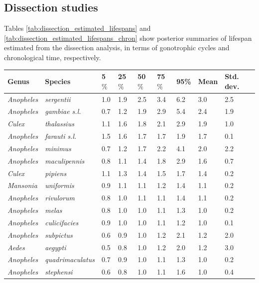 \documentclass[12pt]{article}
\begin{document}
{\subsection{Dissection studies}
Tables \ref{tab:dissection_estimated_lifespans} and \ref{tab:dissection_estimated_lifespans_chron} show posterior summaries of lifespan estimated from the dissection analysis, in terms of gonotrophic cycles and chronological time, respectively.

\begin{table}[htbp]
\begin{tabular}{l|l|l|l|l|l|l|l|l}
	\textbf{Genus} & \textbf{Species} & \textbf{5$\%$} & \textbf{25$\%$} & \textbf{50$\%$} & \textbf{75$\%$} & \textbf{95\%} &  \textbf{Mean} & \textbf{Std. dev.}\\
		\hline
		\textit{Anopheles} & \textit{sergentii} & 1.0 & 1.9 & 2.5 & 3.4 & 6.2 & 3.0 & 2.5 \\
		\textit{Anopheles} & \textit{gambiae s.l.} & 0.7 & 1.2 & 1.9 & 2.9 & 5.4 & 2.4 & 1.9 \\
		\textit{Culex} & \textit{thalassius} & 1.1 & 1.6 & 1.8 & 2.1 & 2.9 & 1.9 & 1.0 \\
		\textit{Anopheles} & \textit{farauti s.l.} & 1.5 & 1.6 & 1.7 & 1.7 & 1.9 & 1.7 & 0.1 \\
		\textit{Anopheles} & \textit{minimus} & 0.7 & 1.2 & 1.7 & 2.2 & 4.1 & 2.0 & 2.2 \\
		\textit{Anopheles} & \textit{maculipennis} & 0.8 & 1.1 & 1.4 & 1.8 & 2.9 & 1.6 & 0.7 \\
		\textit{Culex} & \textit{pipiens} & 1.1 & 1.3 & 1.4 & 1.5 & 1.7 & 1.4 & 0.2 \\
		\textit{Mansonia} & \textit{uniformis} & 0.9 & 1.1 & 1.1 & 1.2 & 1.4 & 1.1 & 0.2 \\
		\textit{Anopheles} & \textit{rivulorum} & 0.8 & 1.0 & 1.1 & 1.1 & 1.4 & 1.1 & 0.2 \\
		\textit{Anopheles} & \textit{melas} & 0.8 & 1.0 & 1.0 & 1.1 & 1.3 & 1.0 & 0.2 \\
		\textit{Anopheles} & \textit{culicifacies} & 0.9 & 1.0 & 1.0 & 1.1 & 1.2 & 1.0 & 0.1 \\
		\textit{Anopheles} & \textit{subpictus} & 0.6 & 0.9 & 1.0 & 1.2 & 2.1 & 1.2 & 2.0 \\
		\textit{Aedes} & \textit{aegypti} & 0.5 & 0.8 & 1.0 & 1.2 & 2.0 & 1.2 & 3.0 \\
		\textit{Anopheles} & \textit{quadrimaculatus} & 0.7 & 0.9 & 1.0 & 1.1 & 1.3 & 1.0 & 0.2 \\
		\textit{Anopheles} & \textit{stephensi} & 0.6 & 0.8 & 1.0 & 1.1 & 1.6 & 1.0 & 0.4 \\

\end{tabular}
\end{table}}
\end{document}
